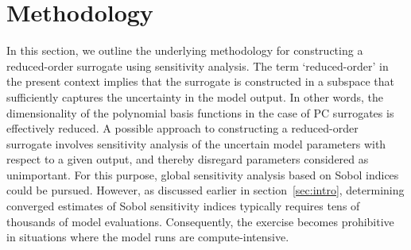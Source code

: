 \section{Methodology}
\label{sec:method}

%

In this section, we outline the underlying methodology for constructing a 
reduced-order surrogate using sensitivity analysis. The term `reduced-order'
in the present context implies that the surrogate is constructed in a 
subspace that sufficiently captures the uncertainty in the model output. 
In other words, the dimensionality of the polynomial basis functions in
the case of PC surrogates is effectively reduced. A possible approach to 
constructing a reduced-order surrogate involves sensitivity analysis of the
uncertain model parameters with respect to a given output, and thereby
disregard parameters considered as unimportant. For this purpose, global
sensitivity analysis based on Sobol indices could be pursued. However,
as discussed earlier in section~\ref{sec:intro}, determining converged 
estimates of Sobol sensitivity indices typically requires tens of thousands
of model evaluations. Consequently, the exercise becomes prohibitive in
situations where the model runs are compute-intensive.    


 

